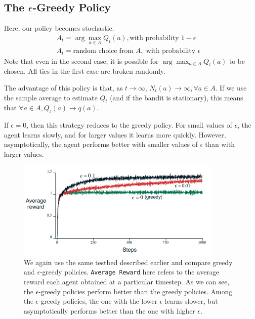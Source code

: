 \documentclass[12pt]{report}
\begin{document}
\subsection{\texorpdfstring{The $\epsilon$-Greedy Policy}{}}
Here, our policy becomes stochastic.
\begin{eqnarray}
    A_{t} = \arg\max_{a \in A} Q_{t}(a), \text{with probability $1 - \epsilon$}\\
    A_{t} = \text{random choice from $A$}, \text{ with probability $\epsilon$}
\end{eqnarray}
Note that even in the second case, it is possible for $\arg\max_{a \in A} Q_{t}(a)$ to be chosen. All ties in the first case are broken randomly.

The advantage of this policy is that, as $t \rightarrow \infty$, $N_{t}(a) \rightarrow \infty, \forall a \in A$. If we use the sample average to estimate 
$Q_{t}$ (and if the bandit is stationary), this means that $\forall a \in A, Q_{t}(a) \rightarrow q(a)$.

If $\epsilon = 0$, then this strategy reduces to the greedy policy. For small values of $\epsilon$, the agent learns slowly, and for larger values it learns more quickly.
However, asymptotically, the agent performs better with smaller values of $\epsilon$ than with larger values.

\begin{figure}[h!]
    \centering
    \includegraphics[width=0.9\textwidth]{images/Epsilon-greedy.png}
    \caption{We again use the same testbed described earlier and compare greedy and $\epsilon$-greedy policies. \texttt{Average Reward} here refers to the average reward each agent obtained at a particular timestep. As we can see, the $\epsilon$-greedy policies perform better than the greedy policies. Among the $\epsilon$-greedy policies, the one with the lower $\epsilon$ learns slower, but asymptotically performs better than the one with higher $\epsilon$.}
\end{figure}
\end{document}
